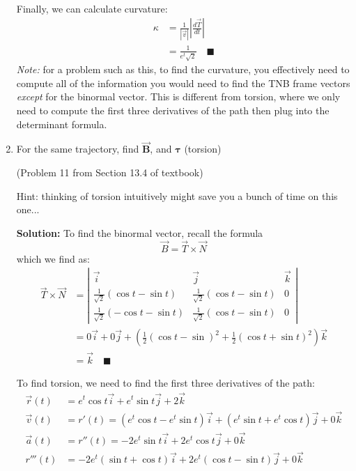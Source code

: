 \documentclass[letterpaper, 11pt]{article}
\begin{document}
\begin{enumerate}
\begin{align*}
\end{align*}
Finally, we can calculate curvature:
\begin{align*}
\kappa &= \frac{1}{|\vec v|} \left | \frac{d\vec T}{dt} \right| \\
&= \frac{1}{e^t \sqrt{2}} \quad\blacksquare
\end{align*}
\textit{Note:} for a problem such as this, to find the curvature, you effectively need to compute all of the information you would need to find the TNB frame vectors \textit{except} for the binormal vector. This is different from torsion, where we only need to compute the first three derivatives of the path then plug into the determinant formula. 


\item For the same trajectory, find $\vec{\bm{B}}$,  and $\bm{\tau}$ (torsion)  

(Problem 11 from Section 13.4 of textbook) 

Hint: thinking of torsion intuitively might save you a bunch of time on this one...

\par \textbf{Solution:} To find the binormal vector, recall the formula
\[ \vec B = \vec T \times \vec N \]
which we find as:
\begin{align*} 
\vec T \times \vec N &= \left| \begin{array}{ccc} \vec i & \vec j & \vec k \\
\frac{1}{\sqrt{2}}(\cos t - \sin t) & \frac{1}{\sqrt{2}}(\cos t - \sin t ) & 0 \\
\frac{1}{\sqrt{2}}(-\cos t- \sin t) & \frac{1}{\sqrt{2}}(\cos t - \sin t) & 0 \end{array} \right| \\
&= 0 \vec i + 0 \vec j + \left( \frac{1}{2}(\cos t - \sin )^2 + \frac{1}{2} ( \cos t + \sin t )^2 \right) \vec k \\
&= \vec k \quad\blacksquare
\end{align*}


To find torsion, we need to find the first three derivatives of the path:
\begin{align*}
\vec r(t) &= e^t \cos t \vec i + e^t \sin t \vec j + 2 \vec k \\
\vec v(t) &= r'(t) = \left( e^t \cos t - e^t \sin t\right) \vec i + \left(e^t \sin t + e^t \cos t \right) \vec j + 0 \vec k \\
\vec a(t) &= r''(t) = -2e^t \sin t \vec i + 2 e^t \cos t \vec j + 0 \vec k \\
r'''(t) &= -2e^t ( \sin t + \cos t) \vec i + 2 e^t ( \cos t - \sin t) \vec j + 0 \vec k 
\end{align*}


\end{enumerate}
\end{document}
